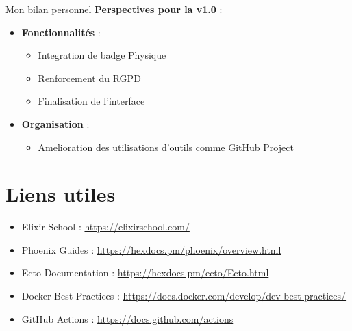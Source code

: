 \begin{for_you}{Mon bilan personnel}
    \textbf{Perspectives pour la v1.0} :
    \begin{itemize}
        \item \textbf{Fonctionnalités} :
              \begin{itemize}
                  \item Integration de badge Physique
                  \item Renforcement du RGPD
                  \item Finalisation de l'interface
              \end{itemize}
        \item \textbf{Organisation} :
              \begin{itemize}
                  \item Amelioration des utilisations d'outils comme GitHub Project
              \end{itemize}
    \end{itemize}
\end{for_you}

\section{Liens utiles}
\begin{itemize}
    \item Elixir School : \url{https://elixirschool.com/}
    \item Phoenix Guides : \url{https://hexdocs.pm/phoenix/overview.html}
    \item Ecto Documentation : \url{https://hexdocs.pm/ecto/Ecto.html}
    \item Docker Best Practices : \url{https://docs.docker.com/develop/dev-best-practices/}
    \item GitHub Actions : \url{https://docs.github.com/actions}
\end{itemize}